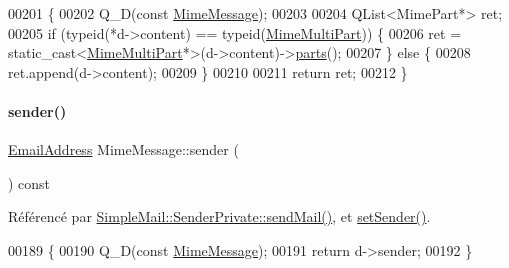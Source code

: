 \begin{DoxyCode}
00201 \{
00202     Q\_D(\textcolor{keyword}{const} \hyperlink{class_simple_mail_1_1_mime_message}{MimeMessage});
00203 
00204     QList<MimePart*> ret;
00205     \textcolor{keywordflow}{if} (\textcolor{keyword}{typeid}(*d->content) == \textcolor{keyword}{typeid}(\hyperlink{class_simple_mail_1_1_mime_multi_part}{MimeMultiPart})) \{
00206         ret = \textcolor{keyword}{static\_cast<}\hyperlink{class_simple_mail_1_1_mime_multi_part}{MimeMultiPart}*\textcolor{keyword}{>}(d->content)->\hyperlink{class_simple_mail_1_1_mime_message_a3159d513eb978ea8b764d5defcde12dd}{parts}();
00207     \} \textcolor{keywordflow}{else} \{
00208         ret.append(d->content);
00209     \}
00210 
00211     \textcolor{keywordflow}{return} ret;
00212 \}
\end{DoxyCode}
\mbox{\label{class_simple_mail_1_1_mime_message_a626953414e4eed9e57ea793eb60a2d6b}} 
\paragraph{\texorpdfstring{sender()}{sender()}}
{\footnotesize\ttfamily \hyperlink{class_simple_mail_1_1_email_address}{Email\+Address} Mime\+Message\+::sender (\begin{DoxyParamCaption}{ }\end{DoxyParamCaption}) const}



Référencé par \hyperlink{class_simple_mail_1_1_sender_private_a2ede5284746e77ee37b8fe96f4bbb100}{Simple\+Mail\+::\+Sender\+Private\+::send\+Mail()}, et \hyperlink{class_simple_mail_1_1_mime_message_ab3bd73dba6b0a49443bcdd6d9e603319}{set\+Sender()}.


\begin{DoxyCode}
00189 \{
00190     Q\_D(\textcolor{keyword}{const} \hyperlink{class_simple_mail_1_1_mime_message}{MimeMessage});
00191     \textcolor{keywordflow}{return} d->sender;
00192 \}
\end{DoxyCode}
\mbox{\label{class_simple_mail_1_1_mime_message_a7d0c5bf41385cfc09619f61391f0ddb8}} 
